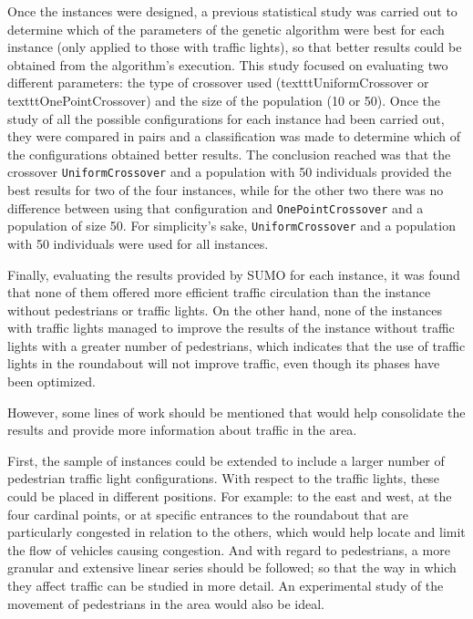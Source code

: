 Once the instances were designed, a previous statistical study was carried out to determine which of the parameters of the genetic algorithm were best for each instance (only applied to those with traffic lights), so that better results could be obtained from the algorithm's execution. This study focused on evaluating two different parameters: the type of crossover used (texttt{UniformCrossover} or texttt{OnePointCrossover}) and the size of the population (10 or 50). Once the study of all the possible configurations for each instance had been carried out, they were compared in pairs and a classification was made to determine which of the configurations obtained better results. The conclusion reached was that the crossover \texttt{UniformCrossover} and a population with 50 individuals provided the best results for two of the four instances, while for the other two there was no difference between using that configuration and \texttt{OnePointCrossover} and a population of size 50. For simplicity's sake, \texttt{UniformCrossover} and a population with 50 individuals were used for all instances.

Finally, evaluating the results provided by SUMO for each instance, it was found that none of them offered more efficient traffic circulation than the instance without pedestrians or traffic lights. On the other hand, none of the instances with traffic lights managed to improve the results of the instance without traffic lights with a greater number of pedestrians, which indicates that the use of traffic lights in the roundabout will not improve traffic, even though its phases have been optimized.

However, some lines of work should be mentioned that would help consolidate the results and provide more information about traffic in the area.

First, the sample of instances could be extended to include a larger number of pedestrian traffic light configurations. With respect to the traffic lights, these could be placed in different positions. For example: to the east and west, at the four cardinal points, or at specific entrances to the roundabout that are particularly congested in relation to the others, which would help locate and limit the flow of vehicles causing congestion. And with regard to pedestrians, a more granular and extensive linear series should be followed; so that the way in which they affect traffic can be studied in more detail. An experimental study of the movement of pedestrians in the area would also be ideal.

